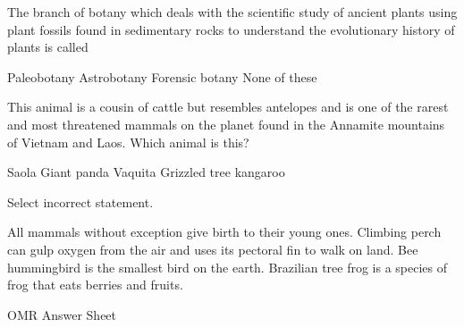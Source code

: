 \documentclass[a4paper,12pt,answers]{exam}
\begin{document}
\begin{questions}
    \question The branch of botany which deals with the scientific study of ancient plants using plant fossils found in sedimentary rocks to understand the evolutionary history of plants is called \fillin

    \begin{randomizeoneparchoices}
        \CorrectChoice Paleobotany
        \choice Astrobotany
        \choice Forensic botany
        \choice None of these
    \end{randomizeoneparchoices}
    
    \question This animal is a cousin of cattle but resembles antelopes and is one of the rarest and most threatened mammals on the planet found in the Annamite mountains of Vietnam and Laos. Which animal is this?

    \begin{randomizeoneparchoices}
        \CorrectChoice Saola
        \choice Giant panda
        \choice Vaquita
        \choice Grizzled tree kangaroo
    \end{randomizeoneparchoices}
    
    \question Select incorrect statement.

    \begin{randomizechoices}
        \CorrectChoice All mammals without exception give birth to their young ones.
        \choice Climbing perch can gulp oxygen from the air and uses its pectoral fin to walk on land.
        \choice Bee hummingbird is the smallest bird on the earth.
        \choice Brazilian tree frog is a species of frog that eats berries and fruits.
    \end{randomizechoices}
\end{questions}

\vspace{10mm}
\newpage
\Huge OMR Answer Sheet

\end{document}
